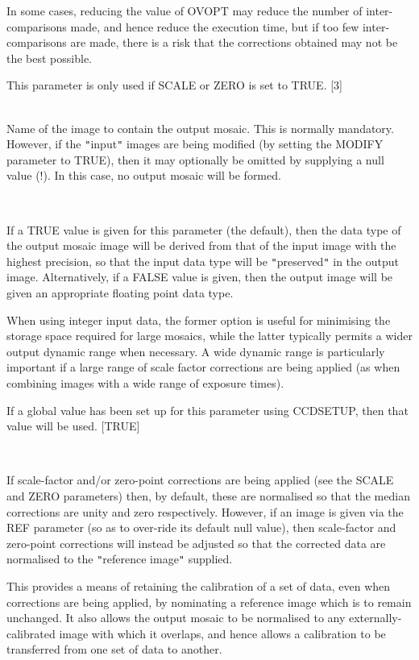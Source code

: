 \documentclass[twoside,11pt]{article}
\newcommand{\htmlref}[2]{#1}
\renewcommand{\_}{\texttt{\symbol{95}}}
\newcommand{\qt}[1]{{\tt "}#1{\tt "}}
\newcommand{\xroutine}[1]{\htmlref{{\sc #1}}{#1}}
\newcommand{\sstsubsection}[1]{ \item[{#1}] \mbox{} \\}
\newcommand{\sstsubsection}[1]{\item[{#1}]}
\begin{document}
{{{         In some cases, reducing the value of OVOPT may reduce the
         number of inter-comparisons made, and hence reduce the
         execution time, but if too few inter-comparisons are made,
         there is a risk that the corrections obtained may not be the
         best possible.

         This parameter is only used if SCALE or ZERO is set to TRUE.
         [3]
      }
      \sstsubsection{
         OUT = image (Write)
      } {
         Name of the image to contain the output mosaic. This is normally
         mandatory. However, if the \qt{input} images are being modified (by
         setting the MODIFY parameter to TRUE), then it may optionally
         be omitted by supplying a null value (!). In this case, no
         output mosaic will be formed.
      }
      \sstsubsection{
         PRESERVE = \_LOGICAL (Read)
      } {
         If a TRUE value is given for this parameter (the default),
         then the data type of the output mosaic image will be derived
         from that of the input image with the highest precision, so that
         the input data type will be \qt{preserved} in the output image.
         Alternatively, if a FALSE value is given, then the output image
         will be given an appropriate floating point data type.

         When using integer input data, the former option is useful for
         minimising the storage space required for large mosaics, while
         the latter typically permits a wider output dynamic range when
         necessary. A wide dynamic range is particularly important if a
         large range of scale factor corrections are being applied (as
         when combining images with a wide range of exposure times).

         If a global value has been set up for this parameter using
         \xroutine{CCDSETUP}, then that value will be used.
         [TRUE]
      }
      \sstsubsection{
         REF = NDF (Read)
      } {
         If scale-factor and/or zero-point corrections are being
         applied (see the SCALE and ZERO parameters) then, by default,
         these are normalised so that the median corrections are unity
         and zero respectively. However, if an image is given via the REF
         parameter (so as to over-ride its default null value), then
         scale-factor and zero-point corrections will instead be
         adjusted so that the corrected data are normalised to the
         \qt{reference image} supplied.

         This provides a means of retaining the calibration of a set of
         data, even when corrections are being applied, by nominating a
         reference image which is to remain unchanged. It also allows the
         output mosaic to be normalised to any externally-calibrated
         image with which it overlaps, and hence allows a calibration to
         be transferred from one set of data to another.

}}}
\end{document}
